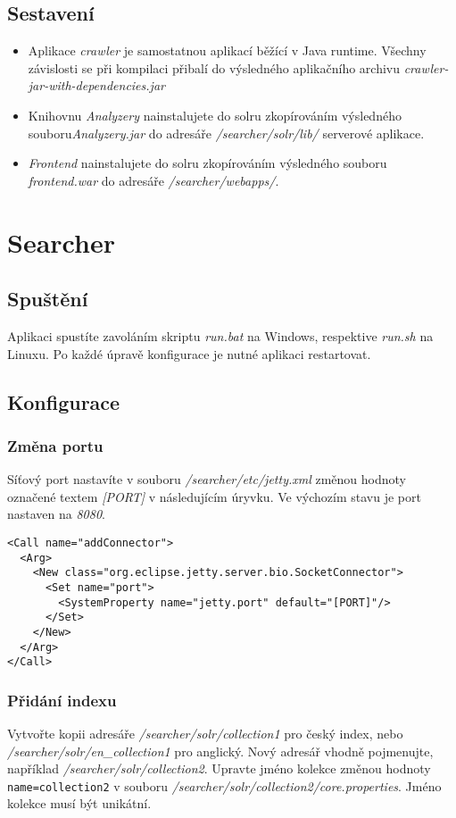 \subsection{Sestavení}
\begin{itemize}
\item Aplikace \emph{crawler} je samostatnou aplikací běžící v Java runtime. Všechny závislosti se při kompilaci přibalí do výsledného aplikačního archivu \emph{crawler-jar-with-dependencies.jar}
\item Knihovnu \emph{Analyzery} nainstalujete do solru zkopírováním výsledného souboru\emph{Analyzery.jar} do adresáře \emph{/searcher/solr/lib/} serverové aplikace.
\item \emph{Frontend} nainstalujete do solru zkopírováním výsledného souboru \emph{frontend.war} do adresáře \emph{/searcher/webapps/}.
\end{itemize}

\section{Searcher}
\subsection{Spuštění}
Aplikaci spustíte zavoláním skriptu \emph{run.bat} na Windows, respektive \emph{run.sh} na Linuxu. Po každé úpravě konfigurace je nutné aplikaci restartovat.

\subsection{Konfigurace}
\subsubsection{Změna portu}
Síťový port nastavíte v souboru \emph{/searcher/etc/jetty.xml} změnou hodnoty označené textem \emph{[PORT]} v následujícím úryvku. Ve výchozím stavu je port nastaven na \emph{8080}.
\begin{verbatim}
<Call name="addConnector">
  <Arg>
    <New class="org.eclipse.jetty.server.bio.SocketConnector">
      <Set name="port">
        <SystemProperty name="jetty.port" default="[PORT]"/>
      </Set>
    </New>
  </Arg>
</Call>
\end{verbatim}

\subsubsection{Přidání indexu}
Vytvořte kopii adresáře \emph{/searcher/solr/collection1} pro český index, nebo \emph{/searcher/solr/en\_collection1} pro anglický. Nový adresář vhodně pojmenujte, například \emph{/searcher/solr/collection2}. Upravte jméno kolekce změnou hodnoty \verb|name=collection2| v souboru \emph{/searcher/solr/collection2/core.properties}. Jméno kolekce musí být unikátní.

